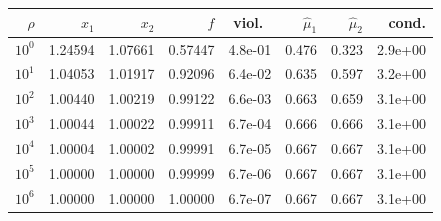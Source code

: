 \begin{tabular}{rrrrrrrr}\toprule
$\rho$ & $x_1$ & $x_2$ & $f$ & viol.\ & $\hat\mu_1$ & $\hat\mu_2$ & cond.\\\midrule
$10^{0}$ & 1.24594 & 1.07661 & 0.57447 & 4.8e-01 & 0.476 & 0.323 & 2.9e+00\\
$10^{1}$ & 1.04053 & 1.01917 & 0.92096 & 6.4e-02 & 0.635 & 0.597 & 3.2e+00\\
$10^{2}$ & 1.00440 & 1.00219 & 0.99122 & 6.6e-03 & 0.663 & 0.659 & 3.1e+00\\
$10^{3}$ & 1.00044 & 1.00022 & 0.99911 & 6.7e-04 & 0.666 & 0.666 & 3.1e+00\\
$10^{4}$ & 1.00004 & 1.00002 & 0.99991 & 6.7e-05 & 0.667 & 0.667 & 3.1e+00\\
$10^{5}$ & 1.00000 & 1.00000 & 0.99999 & 6.7e-06 & 0.667 & 0.667 & 3.1e+00\\
$10^{6}$ & 1.00000 & 1.00000 & 1.00000 & 6.7e-07 & 0.667 & 0.667 & 3.1e+00\\
\bottomrule\end{tabular}
